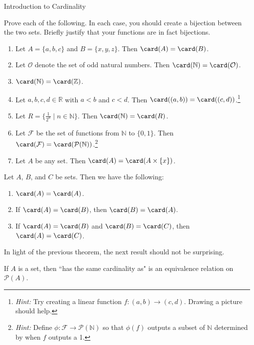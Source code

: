 \begin{section}{Introduction to Cardinality}
\begin{problem}
Prove each of the following. In each case, you should create a bijection between the two sets. Briefly justify that your functions are in fact bijections.
\begin{enumerate}[label=\textrm{(\alph*)}]
\item Let $A=\{a,b,c\}$ and $B=\{x,y,z\}$. Then $\card(A)=\card(B)$.
\item Let $\mathcal{O}$ denote the set of odd natural numbers. Then $\card(\mathbb{N})=\card(\mathcal{O})$. 
\item $\card(\mathbb{N})=\card(\mathbb{Z})$.
\item Let $a,b,c,d\in\mathbb{R}$ with $a<b$ and $c<d$. Then $\card((a,b))=\card((c,d))$.\footnote{\emph{Hint:} Try creating a linear function $f:(a,b)\to (c,d)$. Drawing a picture should help.}
\item Let $R=\{\frac{1}{2^n}\mid n\in \mathbb{N}\}$. Then $\card(\mathbb{N})=\card(R)$.
\item Let $\mathcal{F}$ be the set of functions from $\mathbb{N}$ to $\{0,1\}$. Then $\card(\mathcal{F})=\card(\mathcal{P}(\mathbb{N}))$.\footnote{\emph{Hint:} Define $\phi:\mathcal{F}\to \mathcal{P}(\mathbb{N})$ so that $\phi(f)$ outputs a subset of $\mathbb{N}$ determined by when $f$ outputs a 1.}
\item Let $A$ be any set. Then $\card(A)=\card(A\times \{x\})$.
\end{enumerate}
\end{problem}

\begin{theorem}
Let $A$, $B$, and $C$ be sets. Then we have the following:
\begin{enumerate}[label=\textrm{(\alph*)}]
\item $\card(A)=\card(A)$.
\item If $\card(A)=\card(B)$, then $\card(B)=\card(A)$.
\item If $\card(A)=\card(B)$ and $\card(B)=\card(C)$, then $\card(A)=\card(C)$.
\end{enumerate}
\end{theorem}

In light of the previous theorem, the next result should not be surprising.

\begin{corollary}
If $A$ is a set, then ``has the same cardinality as" is an equivalence relation on $\mathcal{P}(A)$.
\end{corollary}


\end{section}
